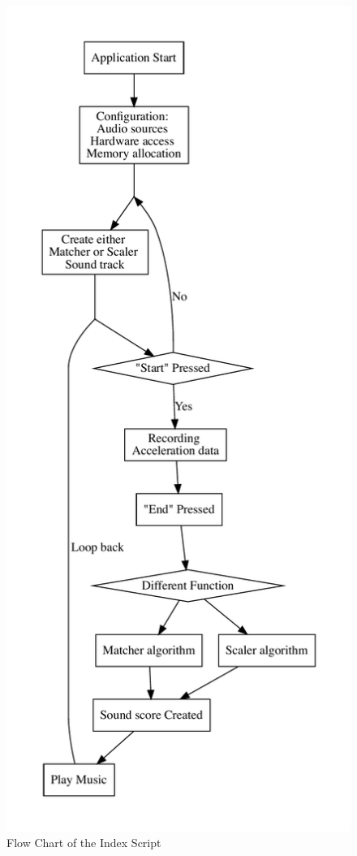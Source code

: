 \begin{figure}[H]
\centering
\includegraphics[height=0.8\textheight]{figWR/a}
\caption{Flow Chart of the Index Script}
\label{indexScript}
\end{figure}

